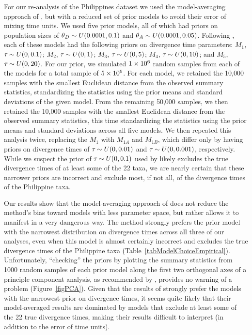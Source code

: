 \documentclass[letterpaper,12pt]{article}
\begin{document}
\begin{linenumbers}
For our re-analysis of the Philippines dataset we used the model-averaging
approach of \citet{Hickerson2013}, but with a reduced set of prior models to
avoid their error of mixing time units.
We used five prior models, all of which had priors on population sizes of
$\meanDescendantTheta{} \sim U(0.0001, 0.1)$ and $\ancestralTheta{} \sim
U(0.0001, 0.05)$.
Following \citet{Hickerson2013}, each of these models had the following
priors on divergence time parameters:
$M_1$, $\tau_{} \sim U(0, 0.1)$;
$M_2$, $\tau_{} \sim U(0, 1)$;
$M_3$, $\tau_{} \sim U(0, 5)$;
$M_4$, $\tau_{} \sim U(0, 10)$; and
$M_5$, $\tau_{} \sim U(0, 20)$.
For our prior, we simulated $1\times 10^{6}$ random samples from each of the models
for a total sample of $5\times 10^{6}$.
For each model, we retained the 10,000 samples with the smallest Euclidean
distance from the observed summary statistics, standardizing the statistics
using the prior means and standard deviations of the given model.
From the remaining 50,000 samples, we then retained the 10,000 samples with the
smallest Euclidean distance from the observed summary statistics, this time
standardizing the statistics using the prior means and standard deviations
across all five models.
We then repeated this analysis twice, replacing the $M_1$ with
$M_{1A}$ and $M_{1B}$, which differ only by having priors on divergence
times of $\tau_{} \sim U(0, 0.01)$ and $\tau_{} \sim U(0, 0.001)$,
respectively.
While we suspect the prior of $\tau_{} \sim U(0, 0.1)$ used by
\citet{Hickerson2013} likely excludes the true divergence times of at least
some of the 22 taxa, we are nearly certain that these narrower priors are
incorrect and exclude most, if not all, of the divergence times of the
Philippine taxa.

Our results show that the model-averaging approach of \citet{Hickerson2013}
does not reduce the method's bias toward models with less parameter space,
but rather allows it to manifest in a very dangerous way.
The method strongly prefers the prior model with the narrowest distribution on
divergence times across all three of our analyses, even when this model is
almost certainly incorrect and excludes the true divergence times of the
Philippine taxa (Table~\ref{tabModelChoiceEmpirical}).
Unfortunately, ``checking'' the priors by plotting the summary statistics from
1000 random samples of each prior model along the first two orthogonal axes of
a principle component analysis, as recommended by \citet{Hickerson2013},
provides no warning of a problem (Figure~\ref{figPCA}).
Given that the results of \citet{Hickerson2013} strongly prefer the models with
the narrowest prior on divergence times, it seems quite likely that their
model-averaged results are dominated by models that exclude at least some of
the 22 true divergence times, making their results difficult to interpret
(in addition to the error of time units).


\end{linenumbers}
\end{document}
